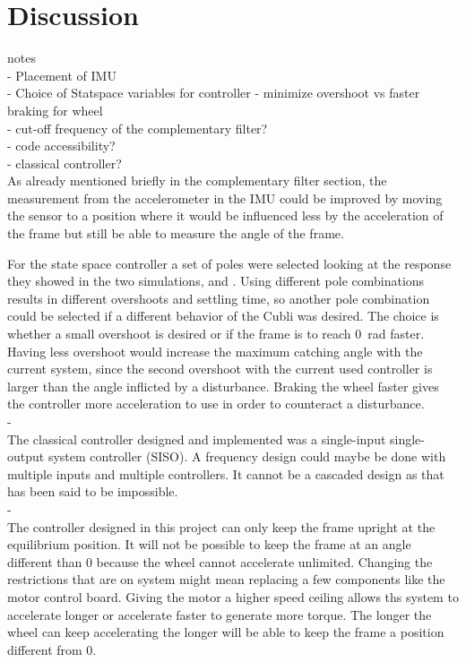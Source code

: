 \chapter{Discussion}

{\Large notes} \\
- Placement of IMU\\
- Choice of Statspace variables for controller - minimize overshoot vs faster braking for wheel\\
- cut-off frequency of the complementary filter?\\
- code accessibility?\\
- classical controller?\\


As already mentioned briefly in the complementary filter section, the measurement from the accelerometer in the IMU could be improved by moving the sensor to a position where it would be influenced less by the acceleration of the frame but still be able to measure the angle of the frame. 

For the state space controller a set of poles were selected looking at the response they showed in the two simulations,  and . Using different pole combinations results in different overshoots and settling time, so another pole combination could be selected if a different behavior of the Cubli was desired. 
The choice is whether a small overshoot is desired or if the frame is to reach \SI{0}{rad} faster. 
Having less overshoot would increase the maximum catching angle with the current system, since the second overshoot with the current used controller is larger than the angle inflicted by a disturbance. 
Braking the wheel faster gives the controller more acceleration to use in order to counteract a disturbance. 
\\-\\
The classical controller designed and implemented was a single-input single-output system controller (SISO). A frequency design could maybe be done with multiple inputs and multiple controllers. It cannot be a cascaded design as that has been said to be impossible. 
\\-\\
The controller designed in this project can only keep the frame upright at the equilibrium position. It will not be possible to keep the frame at an angle different than \si{0^\circ} because the wheel cannot accelerate unlimited. Changing the restrictions that are on system might mean replacing a few components like the motor control board. Giving the motor a higher speed ceiling allows ths system to accelerate longer or accelerate faster to generate more torque. The longer the wheel can keep accelerating the longer will be able to keep the frame a position different from \si{0^\circ}.